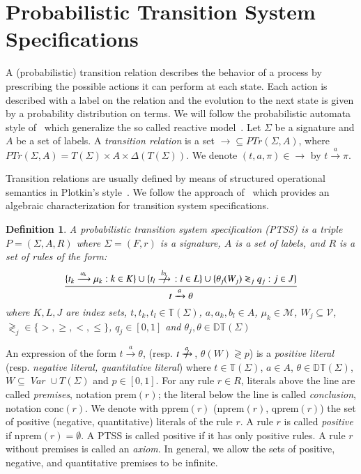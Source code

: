 \documentclass[submission,copyright,creativecommons]{eptcs}
\newtheorem{definition}{Definition}
\newcommand{\ddedrule}[2]{\frac{\displaystyle #1}{\displaystyle #2}}
\newcommand{\trans}[1][]{\xrightarrow{\, {#1} \, }}
\newcommand{\ntrans}[1][]{\mathrel{{\trans[#1]}\makebox[0em][r]{$\not$\hspace{2ex}}}{\!}}
\newcommand{\openT}{\mathbb{T}}
\newcommand{\openTerms}{\openT(\Sigma)}
\newcommand{\closedTerms}{T(\Sigma)}
\newcommand{\openDT}{\mathbb{DT}}
\newcommand{\openDTerms}{\openDT(\Sigma)}
\newcommand{\Var}{\mathop{\textit{Var}}}
\newcommand{\PTrn}{\textit{PTr}}
\newcommand{\PTr}{\PTrn(\Sigma, A)}
\newcommand{\pprem}[1]{\textrm{pprem}(#1)}
\newcommand{\nprem}[1]{\textrm{nprem}(#1)}
\newcommand{\qprem}[1]{\textrm{qprem}(#1)}
\newcommand{\prem}[1]{\textrm{prem}(#1)}
\newcommand{\conc}[1]{\textrm{conc}(#1)}
\newcommand{\TVar}{\mathcal{V}}
\newcommand{\PVar}{\mathcal{M}}
\newcommand{\Act}{A}
\begin{document}
\section{Probabilistic Transition System Specifications}\label{sec:ptss}


A (probabilistic) transition relation describes the behavior of a
process by prescribing the possible actions it can perform at each
state.
Each action is described with a label on the relation and the
evolution to the next state is given by a probability distribution on
terms.
We will follow the probabilistic automata style of~\cite{Segala95} which generalize the so
called reactive model~\cite{LarsenSkou91}.  Let $\Sigma$ be a
signature and $\Act$ be a set of labels.  A \emph{transition relation}
is a set ${\trans} \subseteq \PTr$, where $\PTr = \closedTerms \times
\Act \times \Delta(\closedTerms)$.  We denote $(t,a,\pi)\in{\trans}$
by $t\trans[a]\pi$.

Transition relations are usually defined by means of structured
operational semantics in Plotkin's style~\cite{Plotkin81}. 
We follow the approach
of~\cite{GrooteVaandrager92,Groote93,BolGroote96} which provides an
algebraic characterization for transition system specifications.


\begin{definition}\label{def:ptss}A \emph{probabilistic transition system specification} (PTSS) is a
  triple $P = (\Sigma, \Act, R)$ where $\Sigma = (F, r)$ is a signature,
  $\Act$ is a set of labels, and $R$ is a set of rules of the form:
\[
  \ddedrule{ \{t_k \trans[a_k] \mu_k : k\in K \}\cup
              \{t_l \ntrans[b_l] : l \in L\} \cup
              \{\theta_j (W_j) \gtrless_j q_j : j \in J\} } { t \trans[a] \theta}
  \]
where
$K, L, J$ are index sets, 
$t, t_k, t_l \in \openTerms$, $a, a_k, b_l \in A$, 
  $\mu_k \in \PVar$, $W_j\subseteq \TVar$,
${\gtrless_j} \in \{{>},{\geq}, <, \leq \}$, $q_j\in[0,1]$
and $\theta_j, \theta \in \openDTerms$
\end{definition}


An expression of the form $t \trans[a] \theta$, (resp. $t \ntrans[a]$, $\theta (W)
\gtrless p$) is a \emph{positive literal} (resp. \emph{negative literal, quantitative literal})
where $t \in \openTerms$, $a \in A$, $\theta \in \openDTerms$, $W \subseteq \Var \cup \closedTerms$ and $p \in [0,1]$.
For any rule $r \in R$, literals above the line are called
\emph{premises}, notation $\prem{r}$; the literal below the line is
called \emph{conclusion}, notation $\conc{r}$.
We denote with $\pprem{r}$ ($\nprem{r}$, $\qprem{r}$) the set of
positive (negative, quantitative) literals of the rule $r$.
A rule $r$ is called \emph{positive} if $\nprem{r} = \emptyset$.  A PTSS is called positive if
it has only positive rules. A rule $r$ without premises is called an
\emph{axiom}.
In general, we allow the sets of positive, negative, and quantitative premises to be infinite.
\end{document}

